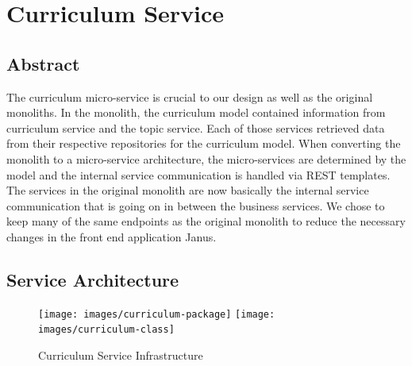 \chapter{Curriculum Service}
\section{Abstract}
The curriculum micro-service is crucial to our design as well as the original monoliths. In the monolith, the curriculum model contained information from curriculum service and the topic service. Each of those services retrieved data from their respective repositories for the curriculum model. When converting the monolith to a micro-service architecture, the micro-services are determined by the model and the internal service communication is handled via REST templates. The services in the original monolith are now basically the internal service communication that is going on in between the business services. We chose to keep many of the same endpoints as the original monolith to reduce the necessary changes in the front end application Janus.


\section{Service Architecture}

\begin{figure}[htp]
\centering
\texttt{[image: images/curriculum-package]}
\texttt{[image: images/curriculum-class]}
\caption{Curriculum Service Infrastructure}
\label{fig:lion}
\end{figure}


